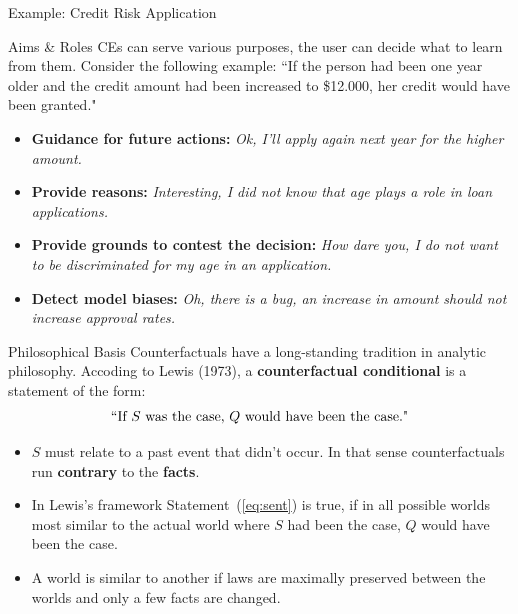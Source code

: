 \documentclass[11pt,compress,t,notes=noshow, xcolor=table]{beamer}
\begin{document}
\begin{vbframe}{Example: Credit Risk Application}
\end{vbframe}



\begin{vbframe}{Aims \& Roles}
	CEs can serve various purposes, the user can decide what to learn from them. Consider the following example:\newline
	``If the person had been one year older and the credit amount had been increased to \$12.000, her credit would have been granted."  \\[0.2cm]
	\begin{itemize}
		\itemsep1.3em
		\item \textbf{Guidance for future actions:} \textit{Ok, I'll apply again next year for the higher amount.}
		\item \textbf{Provide reasons:} \textit{Interesting, I did not know that age plays a role in loan applications.}
		\item \textbf{Provide grounds to contest the decision:} \textit{How dare you, I do not want to be discriminated for my age in an application.}
		\item \textbf{Detect model biases:} \textit{Oh, there is a bug, an increase in amount should not increase approval rates.}
	\end{itemize}
\end{vbframe}

\begin{vbframe}{Philosophical Basis}
Counterfactuals have a long-standing tradition in analytic philosophy. %
Accoding to Lewis (1973), a \textbf{counterfactual conditional} is a statement of the form:	
\begin{equation}
		\textnormal{``If $S$ was the case, $Q$ would have been the case."}
		\label{eq:sent}
\end{equation}
	\begin{itemize}
		\item $S$ must relate to a past event that didn't occur. In that sense counterfactuals run \textbf{contrary} to the \textbf{facts}.
		\item In Lewis's framework Statement~(\ref{eq:sent}) is true, if in all possible worlds most similar to the actual world where $S$ had been the case, $Q$ would have been the case. 
		\item A world is similar to another if laws are maximally preserved between the worlds and only a few facts are changed.
	\end{itemize}
\end{vbframe}
\end{document}
